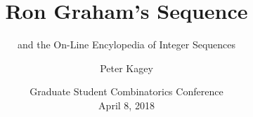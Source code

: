 \documentclass{beamer}
\title[Ron Graham's Sequence]{Ron Graham's Sequence}
\subtitle{and the On-Line Encylopedia of Integer Sequences}
\author{Peter Kagey}
\institute{University of Southern California}
\date[]{
  Graduate Student Combinatorics Conference\\
  April 8, 2018
}
\begin{document}
\begin{frame}
  \titlepage
\end{frame}


%
%
%
\end{document}
